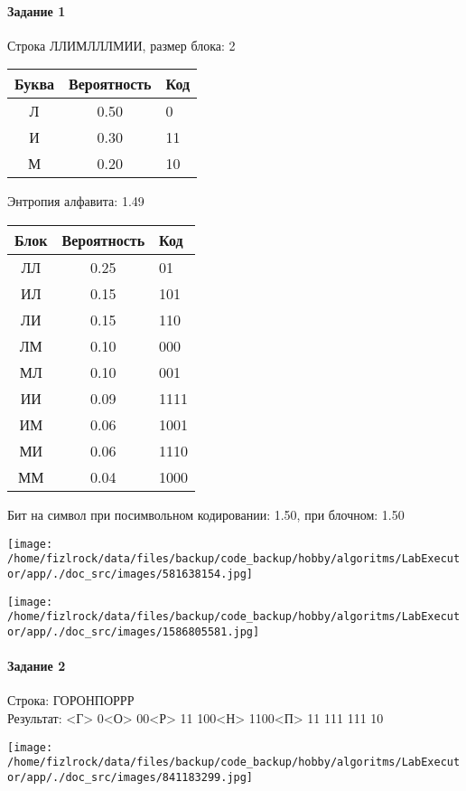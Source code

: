 \documentclass[a4paper, 12pt]{article}
\begin{document}
\paragraph{Задание 1}

Строка ЛЛИМЛЛЛМИИ, размер блока: 2
\begin{center}
 \begin{tabular}{ |c|c|l| } 
  \hline
     Буква & Вероятность & Код\\ \hline
Л & 0.50 & 0\\\hline
И & 0.30 & 11\\\hline
М & 0.20 & 10
\\ \hline \end{tabular}
\end{center}
Энтропия алфавита: 1.49
\begin{center}
 \begin{tabular}{ |c|c|l| } 
  \hline
     Блок & Вероятность & Код\\ \hline
ЛЛ & 0.25 & 01\\\hline
ИЛ & 0.15 & 101\\\hline
ЛИ & 0.15 & 110\\\hline
ЛМ & 0.10 & 000\\\hline
МЛ & 0.10 & 001\\\hline
ИИ & 0.09 & 1111\\\hline
ИМ & 0.06 & 1001\\\hline
МИ & 0.06 & 1110\\\hline
ММ & 0.04 & 1000
\\ \hline \end{tabular}
\end{center}
Бит на символ при посимвольном кодировании: 1.50, при блочном: 1.50

\texttt{[image: /home/fizlrock/data/files/backup/code\_backup/hobby/algoritms/LabExecutor/app/./doc\_src/images/581638154.jpg]}

\texttt{[image: /home/fizlrock/data/files/backup/code\_backup/hobby/algoritms/LabExecutor/app/./doc\_src/images/1586805581.jpg]}
\pagebreak
\paragraph{Задание 2}

Строка: 
ГОРОНПОРРР\\
Результат: <Г> 0<О> 00<Р> 11 100<Н> 1100<П> 11 111 111 10

\texttt{[image: /home/fizlrock/data/files/backup/code\_backup/hobby/algoritms/LabExecutor/app/./doc\_src/images/841183299.jpg]}
\end{document}
